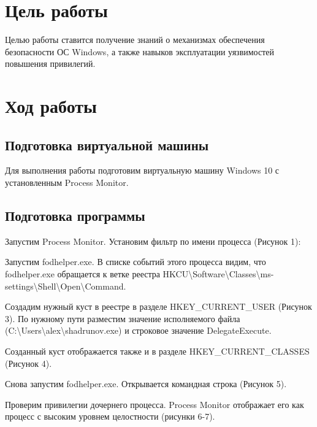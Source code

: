 \section{Цель работы}
Целью работы ставится получение знаний о механизмах обеспечения безопасности ОС Windows, а также навыков эксплуатации уязвимостей повышения привилегий.


\section{Ход работы}
\subsection{Подготовка виртуальной машины}

Для выполнения работы подготовим виртуальную машину Windows 10 с установленным Process Monitor.

\subsection{Подготовка программы}
Запустим Process Monitor. Установим фильтр по имени процесса (Рисунок 1):

\FloatBarrier

Запустим fodhelper.exe. В списке событий этого процесса видим, что fodhelper.exe обращается к ветке реестра HKCU\textbackslash Software\textbackslash Classes\textbackslash ms-settings\textbackslash Shell\textbackslash Open\textbackslash Command.
\FloatBarrier

Создадим нужный куст в реестре в разделе HKEY\_CURRENT\_USER (Рисунок 3). По нужному пути разместим значение исполняемого файла \linebreak (C:\textbackslash Users\textbackslash alex\textbackslash shadrunov.exe) и строковое значение DelegateExecute.
\FloatBarrier

Созданный куст отображается также и в разделе HKEY\_CURRENT\_CLASSES (Рисунок 4).
\FloatBarrier

Снова запустим fodhelper.exe. Открывается командная строка (Рисунок 5).
\FloatBarrier

Проверим привилегии дочернего процесса. Process Monitor отображает его как процесс с высоким уровнем целостности (рисунки 6-7).
\FloatBarrier

